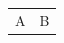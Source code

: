 \documentclass{article}
\begin{document}
\begin{tabular}{ll}\rowcolor{teal!10}A&B\\\end{tabular}
\end{document}
